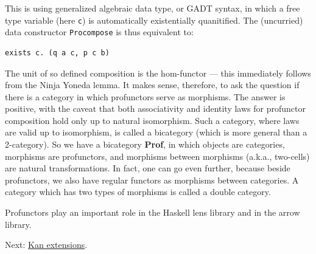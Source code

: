 This is using generalized algebraic data type, or GADT syntax, in which
a free type variable (here \texttt{c}) is automatically existentially
quanitified. The (uncurried) data constructor \texttt{Procompose} is
thus equivalent to:

\begin{verbatim}
exists c. (q a c, p c b)
\end{verbatim}

The unit of so defined composition is the hom-functor --- this
immediately follows from the Ninja Yoneda lemma. It makes sense,
therefore, to ask the question if there is a category in which
profunctors serve as morphisms. The answer is positive, with the caveat
that both associativity and identity laws for profunctor composition
hold only up to natural isomorphism. Such a category, where laws are
valid up to isomorphism, is called a bicategory (which is more general
than a 2-category). So we have a bicategory \textbf{Prof}, in which
objects are categories, morphisms are profunctors, and morphisms between
morphisms (a.k.a., two-cells) are natural transformations. In fact, one
can go even further, because beside profunctors, we also have regular
functors as morphisms between categories. A category which has two types
of morphisms is called a double category.

Profunctors play an important role in the Haskell lens library and in
the arrow library.

Next: \href{https://bartoszmilewski.com/2017/04/17/kan-extensions/}{Kan
extensions}.
